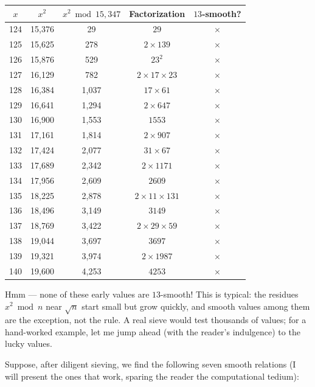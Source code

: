 \documentclass[12pt, letterpaper, openany]{book}
\theoremstyle{definition}
\theoremstyle{remark}
\begin{document}
\begin{center}
\begin{tabular}{|c|c|c|c|c|}
\hline
$x$ & $x^2$ & $x^2 \bmod 15{,}347$ & Factorization & $13$-smooth? \\
\hline
124 & 15,376 & 29 & $29$ & {$\times$} \\
125 & 15,625 & 278 & $2 \times 139$ & {$\times$} \\
126 & 15,876 & 529 & $23^2$ & {$\times$} \\
127 & 16,129 & 782 & $2 \times 17 \times 23$ & {$\times$} \\
128 & 16,384 & 1,037 & $17 \times 61$ & {$\times$} \\
129 & 16,641 & 1,294 & $2 \times 647$ & {$\times$} \\
130 & 16,900 & 1,553 & $1553$ & {$\times$} \\
131 & 17,161 & 1,814 & $2 \times 907$ & {$\times$} \\
132 & 17,424 & 2,077 & $31 \times 67$ & {$\times$} \\
133 & 17,689 & 2,342 & $2 \times 1171$ & {$\times$} \\
134 & 17,956 & 2,609 & $2609$ & {$\times$} \\
135 & 18,225 & 2,878 & $2 \times 11 \times 131$ & {$\times$} \\
136 & 18,496 & 3,149 & $3149$ & {$\times$} \\
137 & 18,769 & 3,422 & $2 \times 29 \times 59$ & {$\times$} \\
138 & 19,044 & 3,697 & $3697$ & {$\times$} \\
139 & 19,321 & 3,974 & $2 \times 1987$ & {$\times$} \\
140 & 19,600 & 4,253 & $4253$ & {$\times$} \\
\hline
\end{tabular}
\end{center}


Hmm --- none of these early values are $13$-smooth! This is typical: the residues $x^2 \bmod n$ near $\sqrt{n}$ start small but grow quickly, and smooth values among them are the exception, not the rule. A real sieve would test thousands of values; for a hand-worked example, let me jump ahead (with the reader's indulgence) to the lucky values.

Suppose, after diligent sieving, we find the following seven smooth relations (I will present the ones that work, sparing the reader the computational tedium):
\end{document}
